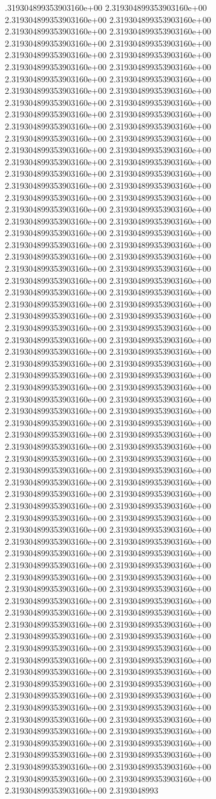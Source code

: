 .319304899353903160e+00	2.319304899353903160e+00	2.319304899353903160e+00	2.319304899353903160e+00	2.319304899353903160e+00	2.319304899353903160e+00	2.319304899353903160e+00	2.319304899353903160e+00	2.319304899353903160e+00	2.319304899353903160e+00	2.319304899353903160e+00	2.319304899353903160e+00	2.319304899353903160e+00	2.319304899353903160e+00	2.319304899353903160e+00	2.319304899353903160e+00	2.319304899353903160e+00	2.319304899353903160e+00	2.319304899353903160e+00	2.319304899353903160e+00	2.319304899353903160e+00	2.319304899353903160e+00	2.319304899353903160e+00	2.319304899353903160e+00	2.319304899353903160e+00	2.319304899353903160e+00	2.319304899353903160e+00	2.319304899353903160e+00	2.319304899353903160e+00	2.319304899353903160e+00	2.319304899353903160e+00	2.319304899353903160e+00	2.319304899353903160e+00	2.319304899353903160e+00	2.319304899353903160e+00	2.319304899353903160e+00	2.319304899353903160e+00	2.319304899353903160e+00	2.319304899353903160e+00	2.319304899353903160e+00	2.319304899353903160e+00	2.319304899353903160e+00	2.319304899353903160e+00	2.319304899353903160e+00	2.319304899353903160e+00	2.319304899353903160e+00	2.319304899353903160e+00	2.319304899353903160e+00	2.319304899353903160e+00	2.319304899353903160e+00	2.319304899353903160e+00	2.319304899353903160e+00	2.319304899353903160e+00	2.319304899353903160e+00	2.319304899353903160e+00	2.319304899353903160e+00	2.319304899353903160e+00	2.319304899353903160e+00	2.319304899353903160e+00	2.319304899353903160e+00	2.319304899353903160e+00	2.319304899353903160e+00	2.319304899353903160e+00	2.319304899353903160e+00	2.319304899353903160e+00	2.319304899353903160e+00	2.319304899353903160e+00	2.319304899353903160e+00	2.319304899353903160e+00	2.319304899353903160e+00	2.319304899353903160e+00	2.319304899353903160e+00	2.319304899353903160e+00	2.319304899353903160e+00	2.319304899353903160e+00	2.319304899353903160e+00	2.319304899353903160e+00	2.319304899353903160e+00	2.319304899353903160e+00	2.319304899353903160e+00	2.319304899353903160e+00	2.319304899353903160e+00	2.319304899353903160e+00	2.319304899353903160e+00	2.319304899353903160e+00	2.319304899353903160e+00	2.319304899353903160e+00	2.319304899353903160e+00	2.319304899353903160e+00	2.319304899353903160e+00	2.319304899353903160e+00	2.319304899353903160e+00	2.319304899353903160e+00	2.319304899353903160e+00	2.319304899353903160e+00	2.319304899353903160e+00	2.319304899353903160e+00	2.319304899353903160e+00	2.319304899353903160e+00	2.319304899353903160e+00	2.319304899353903160e+00	2.319304899353903160e+00	2.319304899353903160e+00	2.319304899353903160e+00	2.319304899353903160e+00	2.319304899353903160e+00	2.319304899353903160e+00	2.319304899353903160e+00	2.319304899353903160e+00	2.319304899353903160e+00	2.319304899353903160e+00	2.319304899353903160e+00	2.319304899353903160e+00	2.319304899353903160e+00	2.319304899353903160e+00	2.319304899353903160e+00	2.319304899353903160e+00	2.319304899353903160e+00	2.319304899353903160e+00	2.319304899353903160e+00	2.319304899353903160e+00	2.319304899353903160e+00	2.319304899353903160e+00	2.319304899353903160e+00	2.319304899353903160e+00	2.319304899353903160e+00	2.319304899353903160e+00	2.319304899353903160e+00	2.319304899353903160e+00	2.319304899353903160e+00	2.319304899353903160e+00	2.319304899353903160e+00	2.319304899353903160e+00	2.3193048993